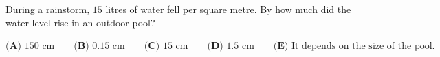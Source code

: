 During a rainstorm, $15$ litres of water fell per square metre. By how much did the water level rise in an outdoor pool?

$\textbf{(A) }150\text{ cm}\qquad\textbf{(B) }0.15\text{ cm}\qquad\textbf{(C) }15\text{ cm}\qquad\textbf{(D) }1.5\text{ cm}\qquad\textbf{(E) }\text{It depends on the size of the pool.}$
